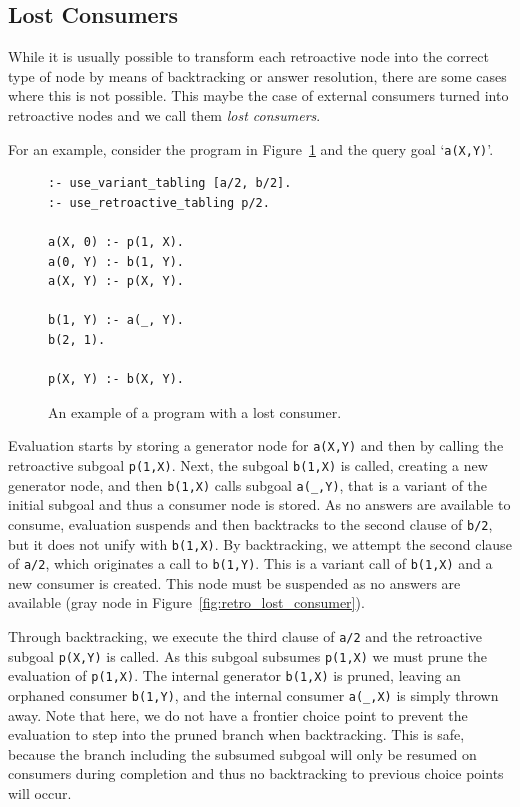 \subsection{Lost Consumers}

While it is usually possible to transform each retroactive node into the correct type of node by means
of backtracking or answer resolution, there are some cases where this is not possible. This maybe the case of
external consumers turned into retroactive nodes and we call them \textit{lost consumers}.

For an example, consider the program in Figure~\ref{fig:retro_lost_consumer_code} and the query goal
`\texttt{a(X,Y)}'.

\begin{figure}[ht]
\begin{Verbatim}
:- use_variant_tabling [a/2, b/2].
:- use_retroactive_tabling p/2.

a(X, 0) :- p(1, X).
a(0, Y) :- b(1, Y).
a(X, Y) :- p(X, Y).

b(1, Y) :- a(_, Y).
b(2, 1).

p(X, Y) :- b(X, Y).
\end{Verbatim}
\caption{An example of a program with a lost consumer.}
\label{fig:retro_lost_consumer_code}
\end{figure}

Evaluation starts by storing a generator node for \texttt{a(X,Y)} and then by calling
the retroactive subgoal \texttt{p(1,X)}. Next, the subgoal \texttt{b(1,X)} is called, creating a new
generator node, and then \texttt{b(1,X)} calls subgoal \texttt{a(\_,Y)}, that is a variant of the
initial subgoal and thus a consumer node is stored. As no answers are available to consume,
evaluation suspends and then backtracks to the second clause of \texttt{b/2}, but it does not
unify with \texttt{b(1,X)}. By backtracking, we attempt the second clause of \texttt{a/2}, which
originates a call to \texttt{b(1,Y)}. This is a variant call of \texttt{b(1,X)} and a new consumer is
created. This node must be suspended as no answers are available (gray node in Figure~\ref{fig:retro_lost_consumer}).

Through backtracking, we execute the third clause of \texttt{a/2} and the retroactive subgoal \texttt{p(X,Y)}
is called. As this subgoal subsumes \texttt{p(1,X)} we must prune the evaluation of \texttt{p(1,X)}.
The internal generator \texttt{b(1,X)} is pruned, leaving an orphaned consumer \texttt{b(1,Y)}, and the internal
consumer \texttt{a(\_,X)} is simply thrown away. Note that here, we do not have a frontier choice point
to prevent the evaluation to step into the pruned branch when backtracking. This is safe, because
the branch including the subsumed subgoal will only be resumed on consumers during completion and thus
no backtracking to previous choice points will occur.

